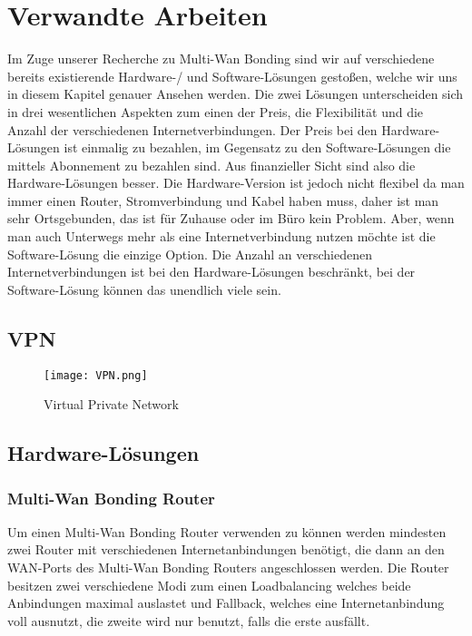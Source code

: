 \chapter{Verwandte Arbeiten}
\label{chap:VerwandteArbeiten}

Im Zuge unserer Recherche zu Multi-Wan Bonding sind wir auf verschiedene bereits existierende Hardware-/ und Software-Lösungen gestoßen, welche wir uns in diesem Kapitel genauer Ansehen werden. Die zwei Lösungen unterscheiden sich in drei wesentlichen Aspekten zum einen der Preis, die Flexibilität und die Anzahl der verschiedenen  Internetverbindungen. Der Preis bei den Hardware-Lösungen ist einmalig zu bezahlen, im Gegensatz zu den Software-Lösungen die mittels Abonnement zu bezahlen sind. Aus finanzieller Sicht sind also die Hardware-Lösungen besser. Die Hardware-Version ist jedoch nicht flexibel da man immer einen Router, Stromverbindung und Kabel haben muss, daher ist man sehr Ortsgebunden, das ist für Zuhause oder im Büro kein Problem. Aber, wenn man auch Unterwegs mehr als eine Internetverbindung nutzen möchte ist die Software-Lösung die einzige Option. Die Anzahl an verschiedenen Internetverbindungen ist bei den Hardware-Lösungen beschränkt, bei der Software-Lösung können das unendlich viele sein.

\section{VPN}

\begin{figure}[H]
    \centering
    \texttt{[image: VPN.png]}
    \caption[VPN]{Virtual Private Network} 
\end{figure}

\section{Hardware-Lösungen}

\subsection{Multi-Wan Bonding Router}
Um einen Multi-Wan Bonding Router verwenden zu können werden mindesten zwei Router mit verschiedenen Internetanbindungen benötigt, die dann an den WAN-Ports des Multi-Wan Bonding Routers angeschlossen werden. Die Router besitzen zwei verschiedene Modi zum einen Loadbalancing welches beide Anbindungen maximal auslastet und Fallback, welches eine Internetanbindung voll ausnutzt, die zweite wird nur benutzt, falls die erste ausfällt.

